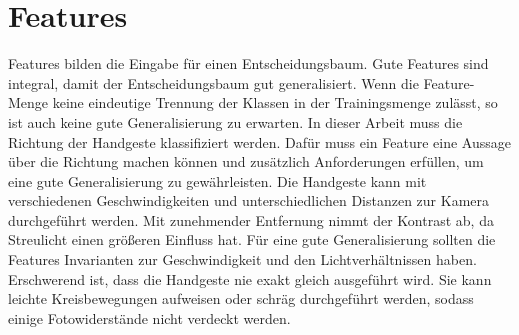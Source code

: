 \section{Features}
Features bilden die Eingabe für einen Entscheidungsbaum. Gute Features sind integral, damit der Entscheidungsbaum gut generalisiert. Wenn die Feature-Menge keine eindeutige Trennung der Klassen in der
Trainingsmenge zulässt, so ist auch keine gute Generalisierung zu erwarten.
\newline
\newline
In dieser Arbeit muss die Richtung der Handgeste klassifiziert werden. Dafür muss ein Feature eine Aussage über die Richtung machen können und zusätzlich Anforderungen erfüllen, um eine gute Generalisierung
zu gewährleisten. Die Handgeste kann mit verschiedenen Geschwindigkeiten und unterschiedlichen Distanzen zur Kamera durchgeführt werden. Mit
zunehmender Entfernung nimmt der Kontrast ab, da Streulicht einen größeren Einfluss hat. Für eine gute Generalisierung sollten die Features Invarianten zur Geschwindigkeit und den
Lichtverhältnissen haben. Erschwerend ist, dass die Handgeste nie exakt gleich ausgeführt wird. Sie kann leichte Kreisbewegungen aufweisen oder schräg durchgeführt werden, sodass einige
Fotowiderstände nicht verdeckt werden.

